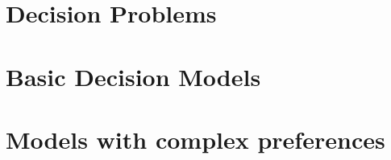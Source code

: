\documentclass[11pt]{report}
\begin{document}
	\maketitle
	\tableofcontents
	\newpage	
	
	\part{Decision Problems}
	
	
	
	
	
	\part{Basic Decision Models}
	
	
	
	
	\part{Models with complex preferences}
	
	
	
	
	
\end{document}
